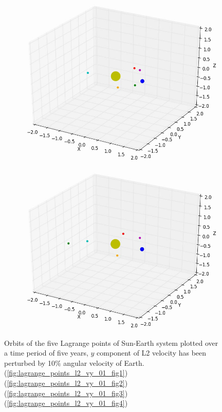 \documentclass[10pt,letterpaper]{article}
\begin{document}
\begin{figure}[!htb]
  \includegraphics[width=\linewidth]{figures/lagrange_points/lagrange_points_l2_vy_01_3.png}
  \subcaption{}\label{fig:lagrange_points_l2_vy_01_fig3}
\endminipage
{}%
  \includegraphics[width=\linewidth]{figures/lagrange_points/lagrange_points_l2_vy_01_4.png}
  \subcaption{}\label{fig:lagrange_points_l2_vy_01_fig4}
\endminipage
\caption{Orbits of the five Lagrange points of Sun-Earth system plotted over a time period of five years, $y$ component of L2 velocity has been perturbed by 10$\%$ angular velocity of Earth.
(\ref{fig:lagrange_points_l2_vy_01_fig1}) 
(\ref{fig:lagrange_points_l2_vy_01_fig2}) 
(\ref{fig:lagrange_points_l2_vy_01_fig3}) 
(\ref{fig:lagrange_points_l2_vy_01_fig4})}\label{fig:lagrange_points_l2_vy_01}
\end{figure}
\end{document}
